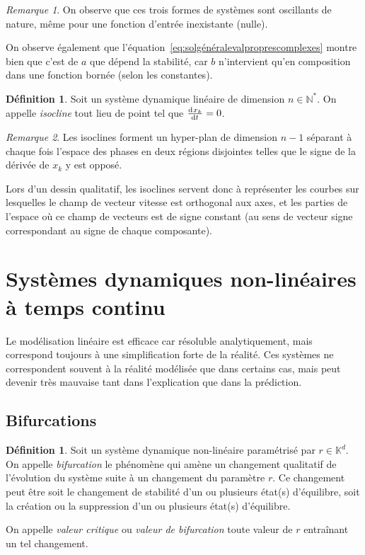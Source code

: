 \documentclass{article}
\theoremstyle{definition}
\newtheorem{déf}[thm]{Définition}
\theoremstyle{remark}
\newtheorem*{rmq}{Remarque}
\newcommand{\N}{\mathbb N}
\newcommand{\K}{\mathbb K}
\begin{document}
	\begin{rmq} On observe que ces trois formes de systèmes sont oscillants de nature, même pour une fonction d'entrée inexistante (nulle).

	On observe également que l'équation~\eqref{eq:solgénéralevalproprescomplexes} montre bien que c'est de $a$ que dépend la stabilité, car $b$ n'intervient
	qu'en composition dans une fonction bornée (selon les constantes).
	\end{rmq}

	\begin{déf} Soit un système dynamique linéaire de dimension $n \in \N^*$. On appelle \textit{isocline} tout lieu de point tel que $\od {x_k}t = 0$.
	\end{déf}

	\begin{rmq} Les isoclines forment un hyper-plan de dimension $n-1$ séparant à chaque fois l'espace des phases en deux régions disjointes telles que le signe
	de la dérivée de $x_k$ y est opposé.

	Lors d'un dessin qualitatif, les isoclines servent donc à représenter les courbes sur lesquelles le champ de vecteur vitesse est orthogonal aux axes, et
	les parties de l'espace où ce champ de vecteurs est de signe constant (au sens de vecteur signe correspondant au signe de chaque composante).
	\end{rmq}

\section{Systèmes dynamiques non-linéaires à temps continu}

	Le modélisation linéaire est efficace car résoluble analytiquement, mais correspond toujours à une simplification forte de la réalité. Ces systèmes ne
	correspondent souvent à la réalité modélisée que dans certains cas, mais peut devenir très mauvaise tant dans l'explication que dans la prédiction.

	\subsection{Bifurcations}

	\begin{déf} Soit un système dynamique non-linéaire paramétrisé par $r \in \K^d$. On appelle \textit{bifurcation} le phénomène qui amène un changement
	qualitatif de l'évolution du système suite à un changement du paramètre $r$. Ce changement peut être soit le changement de stabilité d'un ou plusieurs
	état(s) d'équilibre, soit la création ou la suppression d'un ou plusieurs état(s) d'équilibre.

	On appelle \textit{valeur critique} ou \textit{valeur de bifurcation} toute valeur de $r$ entraînant un tel changement.
	\end{déf}
\end{document}
